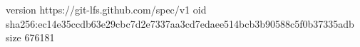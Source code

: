 version https://git-lfs.github.com/spec/v1
oid sha256:ec14e35ccdb63e29cbc7d2e7337aa3cd7edaee514bcb3b90588c5f0b37335adb
size 676181
